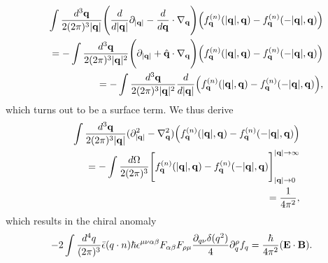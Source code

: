 \documentclass[aps,prd,showkeys,preprint,amsmath,amssymb,nofootinbib]{revtex4-1}
\newcommand{\red}[1]{{\color{red} #1} }
\begin{document}
\begin{eqnarray}\nonumber
&&\int\frac{d^3{\bf q}}{2(2\pi)^3|{\bf q}|}
\Bigg(\frac{d}{d|{\bf q}|}\partial_{|{\bf q}|}-\frac{d}{d{\bf q}}\cdot\nabla_{\bf q}\Bigg)\Big(f^{(n)}_{\bf q}(|{\bf q}|,{\bf q})-f^{(n)}_{\bf q}(-|{\bf q}|,{\bf q})\Big)
\\\nonumber
&&=-\int\frac{d^3{\bf q}}{2(2\pi)^3|{\bf q}|^2}
\Bigg(\partial_{|{\bf q}|}+\hat{\bf q}\cdot\nabla_{\bf q}\Bigg)\Big(f^{(n)}_{\bf q}(|{\bf q}|,{\bf q})-f^{(n)}_{\bf q}(-|{\bf q}|,{\bf q})\Big)
\\
&&=-\int\frac{d^3{\bf q}}{2(2\pi)^3|{\bf q}|^2}
\frac{d}{d|{\bf q}|}\Big(f^{(n)}_{\bf q}(|{\bf q}|,{\bf q})-f^{(n)}_{\bf q}(-|{\bf q}|,{\bf q})\Big),
\end{eqnarray}
which turns out to be a surface term. We thus derive
\begin{eqnarray}\nonumber
&&\int\frac{d^3{\bf q}}{2(2\pi)^3|{\bf q}|}
(\partial^2_{|{\bf q}|}-\nabla^2_{\bf q})\Big(f^{(n)}_{\bf q}(|{\bf q}|,{\bf q})-f^{(n)}_{\bf q}(-|{\bf q}|,{\bf q})\Big)
\\\nonumber
&&=-\int\frac{d\Omega}{2(2\pi)^3}\Bigg[f^{(n)}_{\bf q}(|{\bf q}|,{\bf q})-f^{(n)}_{\bf q}(-|{\bf q}|,{\bf q})\Bigg]^{|{\bf q}|\rightarrow\infty}_{|{\bf q}|\rightarrow 0}
\\
&&=\frac{1}{4\pi^2},
\end{eqnarray}
which results in the chiral anomaly
\begin{eqnarray}
-2\int\frac{d^4q}{(2\pi)^3}\bar{\epsilon}(q\cdot n)\hbar\epsilon^{\mu\nu\alpha\beta}F_{\alpha\beta}F_{\rho\mu}\frac{\partial_{q\nu}\delta(q^2)}{4}\partial^{\rho}_qf_q=\frac{\hbar}{4\pi^2}({\bf E\cdot B}).
\end{eqnarray}
\end{document}
